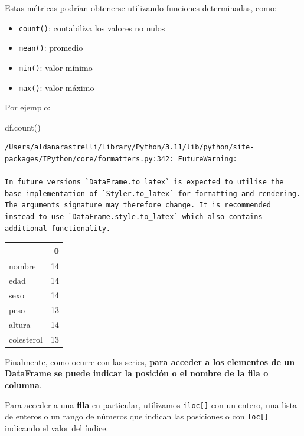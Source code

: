 \documentclass[
  letterpaper,
  DIV=11,
  numbers=noendperiod]{scrreprt}
\newenvironment{Shaded}{\begin{snugshade}}{\end{snugshade}}
\newcommand{\NormalTok}[1]{\textcolor[rgb]{0.00,0.23,0.31}{#1}}
\providecommand{\tightlist}{%
  \setlength{\itemsep}{0pt}\setlength{\parskip}{0pt}}\usepackage{longtable,booktabs,array}
\begin{document}
Estas métricas podrían obtenerse utilizando funciones determinadas,
como:\\

\begin{itemize}
\tightlist
\item
  \texttt{count()}: contabiliza los valores no nulos
\item
  \texttt{mean()}: promedio
\item
  \texttt{min()}: valor mínimo
\item
  \texttt{max()}: valor máximo
\end{itemize}

Por ejemplo:

\begin{Shaded}
\begin{Highlighting}[]
\NormalTok{df.count()}
\end{Highlighting}
\end{Shaded}

\begin{verbatim}
/Users/aldanarastrelli/Library/Python/3.11/lib/python/site-packages/IPython/core/formatters.py:342: FutureWarning:

In future versions `DataFrame.to_latex` is expected to utilise the base implementation of `Styler.to_latex` for formatting and rendering. The arguments signature may therefore change. It is recommended instead to use `DataFrame.style.to_latex` which also contains additional functionality.
\end{verbatim}

\begin{tabular}{lr}
\toprule
{} &   0 \\
\midrule
nombre     &  14 \\
edad       &  14 \\
sexo       &  14 \\
peso       &  13 \\
altura     &  14 \\
colesterol &  13 \\
\bottomrule
\end{tabular}

Finalmente, como ocurre con las series, \textbf{para acceder a los
elementos de un DataFrame se puede indicar la posición o el nombre de la
fila o columna}.

Para acceder a una \textbf{fila} en particular, utilizamos
\texttt{iloc{[}{]}} con un entero, una lista de enteros o un rango de
números que indican las posiciones o con \texttt{loc{[}{]}} indicando el
valor del índice.
\end{document}
